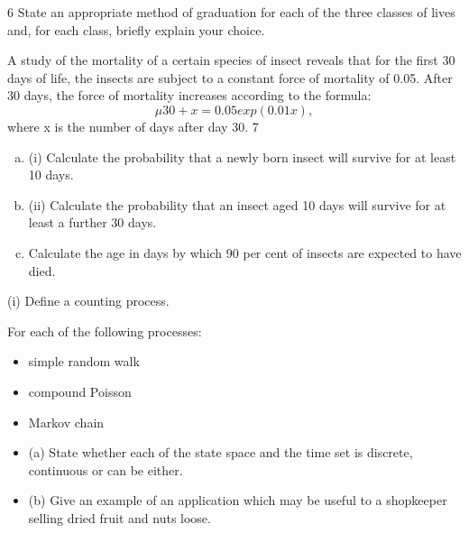 \documentclass[a4paper,12pt]{article}
\begin{document}
\begin{enumerate}
6
State an appropriate method of graduation for each of the three classes of lives
and, for each class, briefly explain your choice.

A study of the mortality of a certain species of insect reveals that for the first 30 days
of life, the insects are subject to a constant force of mortality of 0.05. After 30 days,
the force of mortality increases according to the formula:
\[\mu 30 + x = 0.05exp(0.01 x ) ,\]
where x is the number of days after day 30.
7
\begin{enumerate}[(a)]
\item (i) Calculate the probability that a newly born insect will survive for at least 10
days.
\item 
(ii) Calculate the probability that an insect aged 10 days will survive for at least a
further 30 days.
\item  Calculate the age in days by which 90 per cent of insects are expected to have
died.
\end{enumerate}
(i) Define a counting process.

For each of the following processes:
\begin{itemize}
\item simple random walk
\item compound Poisson
\item Markov chain
\end{itemize}
\begin{itemize}
\item (a) State whether each of the state space and the time set is discrete,
continuous or can be either.
\item (b) Give an example of an application which may be useful to a
shopkeeper selling dried fruit and nuts loose.
\end{itemize}


\end{enumerate}
\end{document}
